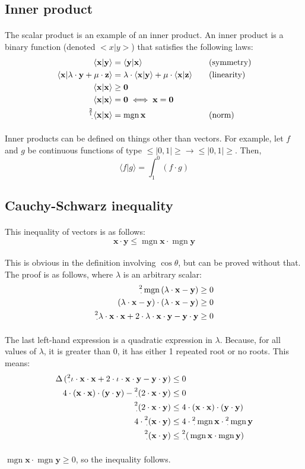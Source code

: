 \documentclass[11pt]{article}
\newcommand*\id{\iota}
\newcommand*\cd{\cdot}
\newcommand*\prg{\paragraph}
\newcommand*\pt{\prescript}
\DeclareMathOperator{\mgn}{mgn}
\begin{document}
\subsection{Inner product}
\prg{}The scalar product is an example of an inner product. An inner product is a binary function (denoted $<x|y>$) that satisfies the following laws:
\[
\begin{aligned}
\langle\mathbf x|\mathbf y\rangle&=\langle\mathbf y|\mathbf x\rangle &&\quad\textrm{(symmetry)}\\
\langle\mathbf x|\lambda\cd\mathbf y+\mu\cd\mathbf z\rangle&=\lambda\cd \langle\mathbf x|\mathbf y\rangle+\mu\cd\langle\mathbf x|\mathbf z\rangle &&\quad\textrm{(linearity)}\\
\langle\mathbf x|\mathbf x\rangle&\geq\mathbf 0\\
\langle\mathbf x|\mathbf x\rangle&=\mathbf 0\iff\mathbf x=\mathbf 0\\
\pt{\frac 21}\cd\langle\mathbf x|\mathbf x\rangle&=\mgn{\mathbf x} &&\quad\textrm{(norm)}
\end{aligned}
\]
\prg{}Inner products can be defined on things other than vectors. For example, let $f$ and $g$ be continuous functions of type ${\leq}|0,1|{\geq}\rightarrow{\leq}|0,1|{\geq}$. Then,
\[
\langle f|g\rangle=\int^0_1(f\cd g)
\]
\subsection{Cauchy-Schwarz inequality}
\prg{}This inequality of vectors is as follows:
\[
\mathbf x\cd\mathbf y\leq\mgn\mathbf x\cd\mgn\mathbf y
\]
\prg{}This is obvious in the definition involving $\cos\theta$, but can be proved without that. The proof is as follows, where $\lambda$ is an arbitrary scalar:
\[
\begin{aligned}
\pt 2\cd{}\mgn{(\lambda\cd\mathbf x-\mathbf y)}&\geq 0\\
(\lambda\cd\mathbf x-\mathbf y)\cd(\lambda\cd\mathbf x-\mathbf y)&\geq 0\\
\pt 2\cd\lambda\cd\mathbf x\cd\mathbf x+2\cd\lambda\cd\mathbf x\cd\mathbf y-\mathbf y\cd\mathbf y&\geq 0
\end{aligned}
\]
\prg{}The last left-hand expression is a quadratic expression in $\lambda$. Because, for all values of $\lambda$, it is greater than $0$, it has either 1 repeated root or no roots. This means:
\[
\begin{aligned}
\Delta\,(\pt 2\cd\id\cd\mathbf x\cd\mathbf x+2\cd\id\cd\mathbf x\cd\mathbf y-\mathbf y\cd\mathbf y)&\leq 0\\
4\cd(\mathbf x\cd\mathbf x)\cd(\mathbf y\cd\mathbf y)-\pt 2\cd(2\cd\mathbf x\cd\mathbf y)&\leq 0\\
\pt 2\cd(2\cd\mathbf x\cd\mathbf y)&\leq 4\cd(\mathbf x\cd\mathbf x)\cd(\mathbf y\cd\mathbf y)\\
4\cd\pt 2\cd(\mathbf x\cd\mathbf y)&\leq 4\cd\pt 2\cd{}\mgn{\mathbf x}\cd\pt 2\cd{}\mgn{\mathbf y}\\
\pt 2\cd(\mathbf x\cd\mathbf y)&\leq\pt 2\cd(\mgn{\mathbf x}\cd\mgn{\mathbf y})\\
\end{aligned}
\]
\prg{}$\mgn{\mathbf x}\cd\mgn{\mathbf y}\geq 0$, so the inequality follows.
\end{document}
